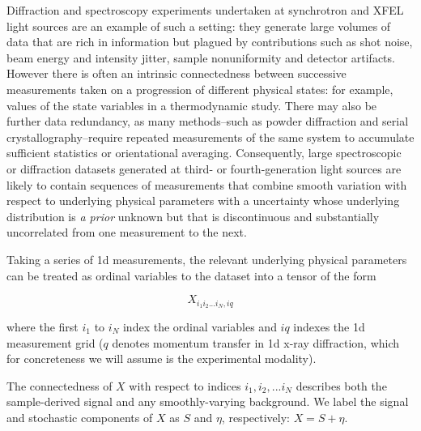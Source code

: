 \documentclass[12pt]{iopart}
\begin{document}
Diffraction and spectroscopy experiments undertaken at synchrotron and XFEL light sources are an example of such a setting: they generate large volumes of data that are rich in information but plagued by contributions such as shot noise, beam energy and intensity jitter, sample nonuniformity and detector artifacts. However there is often an intrinsic connectedness between successive measurements taken on a progression of different physical states: for example, values of the state variables in a thermodynamic study. There may also be further data redundancy, as many methods--such as powder diffraction and serial crystallography--require repeated measurements of the same system to accumulate sufficient statistics or orientational averaging. Consequently, large spectroscopic or diffraction datasets generated at third- or fourth-generation light sources are likely to contain sequences of measurements that combine smooth variation with respect to underlying physical parameters with a uncertainty whose underlying distribution is \emph{a prior} unknown but that is discontinuous and substantially uncorrelated from one measurement to the next. 

Taking a series of 1d measurements, the relevant underlying physical parameters can be treated as ordinal variables to the dataset into a tensor of the form 

\begin{equation}
X_{i_1i_2...i_N, iq}
\end{equation}

where the first $i_1$ to $i_N$ index the ordinal variables and $iq$ indexes the 1d measurement grid ($q$ denotes momentum transfer in 1d x-ray diffraction, which for concreteness we will assume is the experimental modality).

%

The connectedness of $X$ with respect to indices $i_1, i_2, ... i_N$ describes both the sample-derived signal and any smoothly-varying
background. We label the signal and stochastic components of $X$ as $S$ and $\eta$, respectively: $X = S + \eta$.
 
\end{document}
